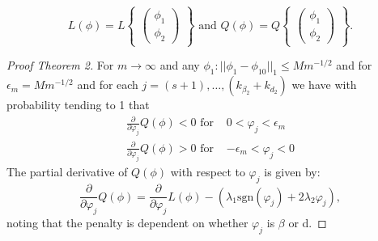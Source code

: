$$L(\phi)=L\begin{Bmatrix}
\begin{pmatrix}
\phi_1 \\ \phi_2
\end{pmatrix}
\end{Bmatrix} \text{ and } Q(\phi)=Q\begin{Bmatrix}
\begin{pmatrix}
\phi_1 \\ \phi_2
\end{pmatrix}
\end{Bmatrix}.$$
\begin{proof}[Proof Theorem 2]
For $m\rightarrow\infty$ and any $\phi_1:||\phi_1-\phi_{10}||_1\le Mm^{-1/2}$ and for  $\epsilon_m=Mm^{-1/2}$ and for each $j=(s+1),\dots,(k_{\beta_2}+k_{d_2})$ we have with probability tending to 1 that
\begin{align}
\label{eq:derivQ}
\frac{\partial}{\partial\varphi_j}Q(\phi)<0 \text{ for } & 0<\varphi_j<\epsilon_m
\\
\frac{\partial}{\partial\varphi_j}Q(\phi)>0 \text{ for } & -\epsilon_m<\varphi_j<0 \nonumber
\end{align}
The partial derivative of $Q(\phi)$ with respect to $\varphi_j$ is given by:
$$\frac{\partial}{\partial\varphi_j}Q(\phi)
=\frac{\partial}{\partial\varphi_j}L(\phi)-\left( \lambda_1\text{sgn}(\varphi_j)+2\lambda_2\varphi_j\right),$$ noting that the penalty is dependent on whether $\varphi_j$ is $\beta$ or d.


\end{proof}

